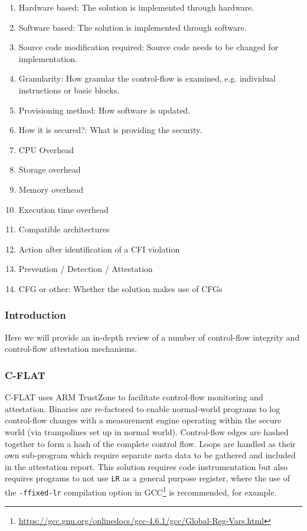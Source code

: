 \begin{enumerate}
	\item Hardware based: The solution is implemented through hardware.
	\item Software based: The solution is implemented through software.
	\item Source code modification required: Source code needs to be changed for implementation.
	\item Granularity: How granular the control-flow is examined, e.g. individual instructions or basic blocks.
	\item Provisioning method: How software is updated.
	\item How it is secured?: What is providing the security.
	\item CPU Overhead
	\item Storage overhead
	\item Memory overhead
	\item Execution time overhead
	\item Compatible architectures
	\item Action after identification of a CFI violation
	\item Prevention / Detection / Attestation
	\item CFG or other: Whether the solution makes use of CFGs
\end{enumerate}

\subsubsection{Introduction}

Here we will provide an in-depth review of a number of control-flow integrity and control-flow attestation mechanisms.

\subsubsection{C-FLAT}
C-FLAT \cite{Abera2016} uses ARM TrustZone to facilitate control-flow monitoring and attestation. Binaries are re-factored to enable normal-world programs to log control-flow changes with a measurement engine operating within the secure world (via trampolines set up in normal world). Control-flow edges are hashed together to form a hash of the complete control flow. Loops are handled as their own sub-program which require separate meta data to be gathered and included in the attestation report. This solution requires code instrumentation but also requires programs to not use \verb|LR| as a general purpose register, where the use of the \verb|-ffixed-lr| compilation option in GCC\footnote{\url{https://gcc.gnu.org/onlinedocs/gcc-4.6.1/gcc/Global-Reg-Vars.html}} is recommended, for example.

